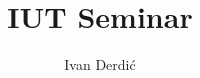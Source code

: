 \documentclass[times, utf8, seminar, numeric]{fer}
\begin{document}
\title{IUT Seminar}

\author{Ivan Derdić}

\maketitle

\tableofcontents















\end{document}
